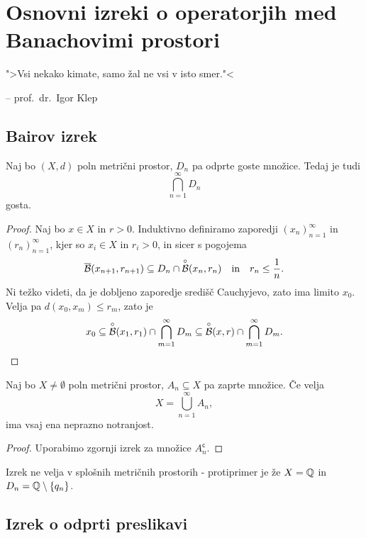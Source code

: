 \section{Osnovni izreki o operatorjih med Banachovimi prostori}

\epigraph{">Vsi nekako kimate, samo žal ne vsi v isto smer."<}{
-- prof.~dr.~Igor Klep}

\subsection{Bairov izrek}

\begin{izrek}[Baire]
Naj bo $(X,d)$ poln metrični prostor, $D_n$ pa odprte goste
množice. Tedaj je tudi
\[
\bigcap_{n=1}^\infty D_n
\]
gosta.
\end{izrek}

\begin{proof}
Naj bo $x \in X$ in $r > 0$. Induktivno definiramo zaporedji
$(x_n)_{n=1}^\infty$ in $(r_n)_{n=1}^\infty$, kjer so $x_i \in X$
in $r_i > 0$, in sicer s pogojema
\[
\overline{\mathcal{B}}(x_{n+1}, r_{n+1}) \subseteq D_n \cap
\overset{\circ}{\mathcal{B}}(x_n, r_n)
\quad \text{in} \quad
r_n \leq \frac{1}{n}.
\]
Ni težko videti, da je dobljeno zaporedje središč Cauchyjevo, zato
ima limito $x_0$. Velja pa $d(x_0, x_m) \leq r_m$, zato je
\[
x_0 \subseteq
\overset{\circ}{\mathcal{B}}(x_1, r_1) \cap \bigcap_{m=1}^\infty D_m \subseteq
\overset{\circ}{\mathcal{B}}(x, r) \cap \bigcap_{m=1}^\infty D_m. \qedhere
\]
\end{proof}

\begin{posledica}
Naj bo $X \ne \emptyset$ poln metrični prostor, $A_n \subseteq X$
pa zaprte množice. Če velja
\[
X = \bigcup_{n=1}^\infty A_n,
\]
ima vsaj ena neprazno notranjost.
\end{posledica}

\begin{proof}
Uporabimo zgornji izrek za množice $A_n^{\mathsf{c}}$.
\end{proof}

\begin{opomba}
Izrek ne velja v splošnih metričnih prostorih - protiprimer je že
$X = \mathbb{Q}$ in $D_n = \mathbb{Q} \setminus \left\{q_n\right\}$.
\end{opomba}

\newpage

\subsection{Izrek o odprti preslikavi}

